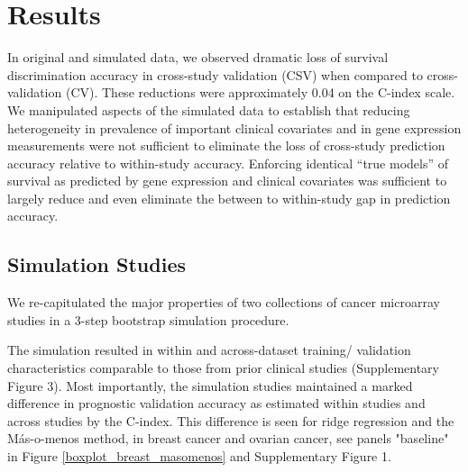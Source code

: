 \documentclass{bioinfo}
\begin{document}
\section{Results}


In original and simulated data,  we observed
dramatic loss of survival discrimination accuracy in cross-study
validation (CSV) when compared to cross-validation (CV). These reductions were
approximately 0.04 on the C-index scale. We manipulated aspects of
the simulated data to establish that reducing heterogeneity in
prevalence of important clinical covariates and in gene expression
measurements were not sufficient to eliminate the loss of cross-study
prediction accuracy relative to within-study accuracy.  %
Enforcing identical ``true models'' of survival as predicted by gene expression and clinical covariates
was sufficient to largely reduce and even eliminate the between to within-study gap in
prediction accuracy. %


  \subsection{Simulation Studies}

  We re-capitulated the major properties of %
  two collections of cancer microarray studies in a 3-step bootstrap
  simulation procedure. 

  The simulation resulted in within and across-dataset
  training/ validation characteristics comparable to those from prior
  clinical studies (Supplementary Figure 3).  Most importantly, the
  simulation studies maintained a marked difference in prognostic
  validation accuracy as estimated within studies and across studies
  by the C-index. This difference is seen for ridge regression 
  and the M\'{a}s-o-menos method, in breast cancer and ovarian cancer, 
  see panels "baseline" in Figure \ref{boxplot_breast_masomenos} and Supplementary Figure 1.
\end{document}
